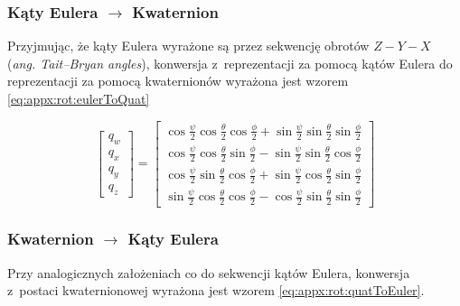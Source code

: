 \subsubsection*{Kąty Eulera $\rightarrow$ Kwaternion}
Przyjmując, że kąty Eulera wyrażone są przez sekwencję obrotów $Z-Y-X$ (\emph{ang. Tait–Bryan angles}), konwersja z~reprezentacji za pomocą kątów Eulera do reprezentacji za pomocą kwaternionów wyrażona jest wzorem \ref{eq:appx:rot:eulerToQuat}
																													
\begin{equation}
	\label{eq:appx:rot:eulerToQuat}
	\begin{bmatrix}
		q_w \\
		q_x \\
		q_y \\
		q_z 
	\end{bmatrix} 
	= 
	\begin{bmatrix}
		\cos{\frac{\psi}{2}}\cos{\frac{\theta}{2}}\cos{\frac{\phi}{2}}+\sin{\frac{\psi}{2}}\sin{\frac{\theta}{2}}\sin{\frac{\phi}{2}} \\
		\cos{\frac{\psi}{2}}\cos{\frac{\theta}{2}}\sin{\frac{\phi}{2}}-\sin{\frac{\psi}{2}}\sin{\frac{\theta}{2}}\cos{\frac{\phi}{2}} \\
		\cos{\frac{\psi}{2}}\sin{\frac{\theta}{2}}\cos{\frac{\phi}{2}}+\sin{\frac{\psi}{2}}\cos{\frac{\theta}{2}}\sin{\frac{\phi}{2}} \\
		\sin{\frac{\psi}{2}}\cos{\frac{\theta}{2}}\cos{\frac{\phi}{2}}-\cos{\frac{\psi}{2}}\sin{\frac{\theta}{2}}\sin{\frac{\phi}{2}} 
	\end{bmatrix}
\end{equation}
																													
\subsubsection*{Kwaternion $\rightarrow$ Kąty Eulera}
Przy analogicznych założeniach co do sekwencji kątów Eulera, konwersja z~postaci kwaternionowej wyrażona jest wzorem \ref{eq:appx:rot:quatToEuler}.
																													
